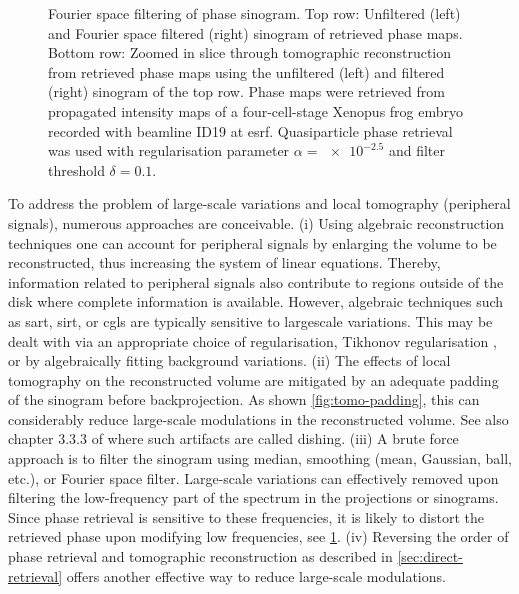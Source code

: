 \documentclass[
twoside,
openright,
titlepage,
numbers=noenddot,
headinclude,
fleqn,
a4paper,
footinclude=true,
cleardoublepage=empty,
abstractoff,
BCOR=5mm,
paper=a4,
fontsize=11pt,
british,ngerman,american,
]{scrreprt}
\begin{document}
\begin{figure}
  \caption[Fourier space filtering of phase sinogram.]{Fourier space
    filtering of phase sinogram. Top row: Unfiltered (left) and
    Fourier space filtered (right) sinogram of retrieved phase maps.
    Bottom row: Zoomed in slice through tomographic reconstruction
    from retrieved phase maps using the unfiltered (left) and filtered
    (right) sinogram of the top row.  Phase maps were retrieved from
    propagated intensity maps of a four-cell-stage Xenopus frog embryo
    recorded with beamline ID19 at \ac{esrf}.  Quasiparticle phase
    retrieval was used with regularisation parameter
    $\alpha=\num{e-2.5}$ and filter threshold $\delta=\num{0.1}$.  }
  \label{fig:tomo-sino-filt}
\end{figure}
To address the problem of large-scale variations and local tomography
(peripheral signals), numerous approaches are conceivable. (i) Using
algebraic reconstruction techniques one can account for peripheral
signals by enlarging the volume to be reconstructed, thus increasing
the system of linear equations.  Thereby, information related to
peripheral signals also contribute to regions outside of the disk
where complete information is available.  However, algebraic
techniques such as \ac{sart}, \ac{sirt}, or \ac{cgls} are typically
sensitive to large\hyph scale variations.  This may be dealt with via
an appropriate choice of regularisation, \eg{} Tikhonov regularisation
\cite{Hansen1993}, or by algebraically fitting background variations.
(ii) The effects of local tomography on the reconstructed volume are
mitigated by an adequate padding of the sinogram before
backprojection.  As shown \cref{fig:tomo-padding}, this can
considerably reduce large-scale modulations in the reconstructed
volume.  See also chapter 3.3.3 of \cite{KacSlaney} where such
artifacts are called dishing.  (iii) A brute force approach is to
filter the sinogram using \eg{} median, smoothing (mean, Gaussian,
ball, etc.), or Fourier space filter.  Large-scale variations can
effectively removed upon filtering the low-frequency part of the
spectrum in the projections or  sinograms.  Since phase retrieval is
sensitive to these frequencies, it is likely to distort the retrieved
phase upon modifying low frequencies, see \cref{fig:tomo-sino-filt}.
(iv) Reversing the order of phase retrieval and tomographic
reconstruction as described in \cref{sec:direct-retrieval} offers
another effective way to reduce large-scale modulations.
\end{document}
